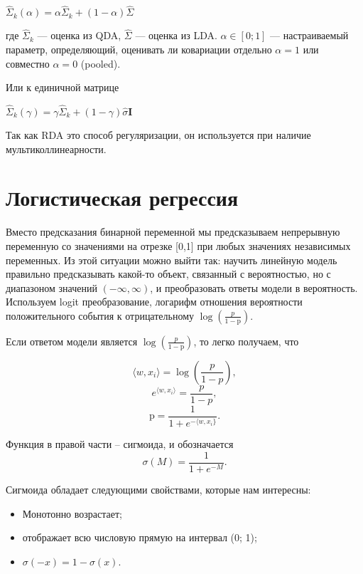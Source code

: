 \documentclass[12pt]{article}
\begin{document}
	\begin{center}
		$\hat \Sigma_k (\alpha) = \alpha \hat \Sigma_k + (1-\alpha) \hat \Sigma$
	\end{center}

	где $\hat \Sigma_k$ --- оценка из QDA, $\hat \Sigma$ --- оценка из LDA. $\alpha \in [0; 1]$ --- настраиваемый параметр, определяющий, оценивать ли ковариации отдельно $\alpha = 1$ или совместно $\alpha = 0$ (pooled).
	
	Или к единичной матрице
	
	\begin{center}
		$\hat \Sigma_k (\gamma) = \gamma \hat \Sigma_k + (1-\gamma) \hat \sigma \mathbf{I}$
	\end{center}

	Так как RDA это способ регуляризации, он используется при наличие мультиколлинеарности.
	
	
	
		
	\section{Логистическая регрессия}
	
	Вместо предсказания бинарной переменной мы предсказываем непрерывную переменную со значениями на отрезке [0,1] при любых значениях независимых переменных. Из этой ситуации можно выйти так:
	научить линейную модель правильно предсказывать какой-то объект,
	связанный с вероятностью, но с диапазоном значений $(-\infty, \infty)$, и преобразовать ответы модели в вероятность. Используем logit преобразование, логарифм отношения вероятности положительного события к отрицательному $\log(\frac{p}{1-\mathrm{p}})$.
	
	Если ответом модели является $\log(\frac{p}{1-\mathrm{p}})$, то легко получаем, что
	
	$$
	\langle w,x_{i}\rangle=\log(\frac{p}{1-p}),
	$$
	$$
	e^{\langle w,x_{i}\rangle}=\frac{p}{1-p},
	$$
	$$
	\mathrm{p}=\frac{1}{1+e^{-\langle w,x_{i}\}}}.
	$$
	
	Функция в правой части -- сигмоида, и обозначается
	$$
	\sigma(M)=\frac{1}{1+e^{-M}}.
	$$
	
	Сигмоида обладает следующими свойствами, которые нам интересны:
	
	\begin{itemize}
		\item Монотонно возрастает;
		\item отображает всю числовую прямую на интервал (0; 1);
		\item $\sigma(-x) = 1 - \sigma(x)$. 
	\end{itemize}
	
\end{document}

